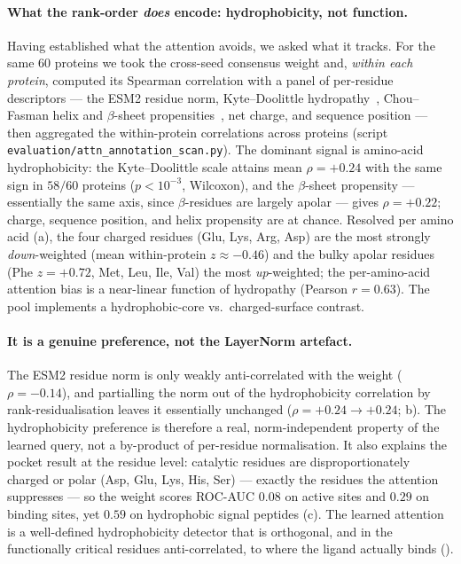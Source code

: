 \documentclass[11pt,a4paper]{article}
\begin{document}
\paragraph{What the rank-order \emph{does} encode: hydrophobicity, not
function.} Having established what the attention avoids, we asked what it
tracks. For the same $60$ proteins we took the cross-seed consensus weight
and, \emph{within each protein}, computed its Spearman correlation with a
panel of per-residue descriptors --- the ESM2 residue norm, Kyte--Doolittle
hydropathy~\citep{kytedoolittle1982}, Chou--Fasman helix and $\beta$-sheet
propensities~\citep{choufasman1978}, net charge, and sequence position ---
then aggregated the within-protein correlations across proteins (script
\texttt{evaluation/attn\_annotation\_scan.py}). The dominant signal is
amino-acid hydrophobicity: the Kyte--Doolittle scale attains mean
$\rho = +0.24$ with the same sign in $58/60$ proteins ($p<10^{-3}$,
Wilcoxon), and the $\beta$-sheet propensity --- essentially the same axis,
since $\beta$-residues are largely apolar --- gives $\rho = +0.22$; charge,
sequence position, and helix propensity are at chance. Resolved per amino
acid (a), the four charged residues
(Glu, Lys, Arg, Asp) are the most strongly \emph{down}-weighted (mean
within-protein $z \approx -0.46$) and the bulky apolar residues
(Phe $z{=}{+}0.72$, Met, Leu, Ile, Val) the most \emph{up}-weighted; the
per-amino-acid attention bias is a near-linear function of hydropathy
(Pearson $r = 0.63$). The pool implements a hydrophobic-core
vs.\ charged-surface contrast.

\paragraph{It is a genuine preference, not the LayerNorm artefact.} The
ESM2 residue norm is only weakly anti-correlated with the weight
($\rho = -0.14$), and partialling the norm out of the hydrophobicity
correlation by rank-residualisation leaves it essentially unchanged
($\rho = +0.24 \to +0.24$; b). The hydrophobicity
preference is therefore a real, norm-independent property of the learned
query, not a by-product of per-residue normalisation. It also explains the
pocket result at the residue level: catalytic residues are
disproportionately charged or polar (Asp, Glu, Lys, His, Ser) --- exactly
the residues the attention suppresses --- so the weight scores ROC-AUC
$0.08$ on active sites and $0.29$ on binding sites, yet $0.59$ on
hydrophobic signal peptides (c). The learned attention
is a well-defined hydrophobicity detector that is orthogonal, and in the
functionally critical residues anti-correlated, to where the ligand
actually binds ().
\end{document}
